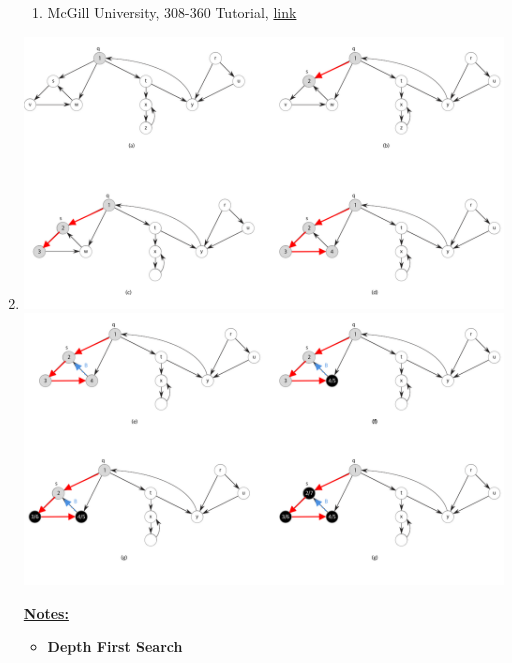 \documentclass[12pt]{article}
\begin{document}
\begin{enumerate}[1.]
    \begin{enumerate}[1)]
        \item McGill University, 308-360 Tutorial, \href{https://www.cs.mcgill.ca/~kaleigh/teaching/360_tutorials/tutorial_02.html}{link}
    \end{enumerate}

    \item

    \bigskip

    \begin{center}
    \includegraphics[width=\linewidth]{images/worksheet_4_solution_21.png}
    \includegraphics[width=\linewidth]{images/worksheet_4_solution_22.png}
    \end{center}

    \bigskip

    \underline{\textbf{Notes:}}

    \bigskip

    \begin{itemize}
        \item \textbf{Depth First Search}


\end{itemize}
\end{enumerate}
\end{document}
